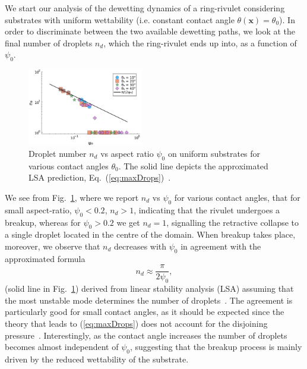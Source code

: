 \documentclass[twoside,twocolumn,9pt]{article}
\begin{document}
We start our analysis of the dewetting dynamics of a ring-rivulet considering substrates with uniform wettability (i.e. constant contact angle 
$\theta(\mathbf{x}) = \theta_0$). In order to discriminate between the two 
available dewetting paths, we look at the final number of droplets $n_d$, which 
the ring-rivulet ends up into, as a function of $\psi_0$.
\begin{figure}
    \centering
    \includegraphics[width=0.45\textwidth]{assets/Ndrops_uni_new.pdf}   
    \caption{Droplet number $n_d$ vs aspect ratio $\psi_0$ on uniform substrates 
    for various contact angles $\theta_0$. The solid line depicts the 
    approximated LSA prediction, Eq.~(\ref{eq:maxDrops})~\cite{gonzalezStabilityLiquidRing2013}.}
    \label{fig:max_drops}
\end{figure}
We see from Fig.~\ref{fig:max_drops}, where we report $n_d$ vs $\psi_0$
for various contact angles, that for small aspect-ratio, $\psi_0 <0.2$,
$n_d>1$, indicating that the rivulet undergoes a breakup, whereas for $\psi_0>0.2$ 
we get $n_d=1$, signalling the retractive collapse to a single droplet located in the centre of the domain.
When breakup takes place, moreover, we observe that $n_d$ decreases with $\psi_0$ in agreement with the approximated formula 
\begin{equation}\label{eq:maxDrops}
    n_d \approx \frac{\pi}{2\psi_0},
\end{equation}
(solid line in Fig.~\ref{fig:max_drops}) 
derived from linear stability analysis (LSA) assuming that 
the most unstable mode determines the number of droplets~\cite{gonzalezStabilityLiquidRing2013}.
The agreement is particularly good for small contact angles, as it should be expected since the theory that leads to (\ref{eq:maxDrops}) does not account for the disjoining pressure~\cite{gonzalezStabilityLiquidRing2013}. Interestingly, as the contact angle increases
the number of droplets becomes almost independent of $\psi_0$, suggesting that the 
breakup process is mainly driven by the reduced wettability of the substrate.
\end{document}

